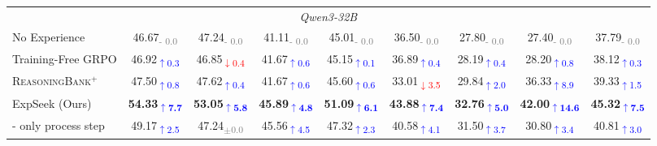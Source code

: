 \begin{table}[!ht]
\begin{tabular*}{0.97\textwidth}{@{\extracolsep{\fill}}l cccc ccc c@{}}
    \midrule
    \multicolumn{9}{c}{\cellcolor{gray!15}\textit{Qwen3-32B}} \\
    No Experience & 46.67\textsubscript{\textcolor{gray}{- 0.0}} & 47.24\textsubscript{\textcolor{gray}{- 0.0}} & 41.11\textsubscript{\textcolor{gray}{- 0.0}} & 45.01\textsubscript{\textcolor{gray}{- 0.0}} & 36.50\textsubscript{\textcolor{gray}{- 0.0}} & 27.80\textsubscript{\textcolor{gray}{- 0.0}} & 27.40\textsubscript{\textcolor{gray}{- 0.0}} & 37.79\textsubscript{\textcolor{gray}{- 0.0}} \\
    Training-Free GRPO & 46.92\textsubscript{\textcolor{blue}{$\uparrow$0.3}} & 46.85\textsubscript{\textcolor{red}{$\downarrow$0.4}} & 41.67\textsubscript{\textcolor{blue}{$\uparrow$0.6}} & 45.15\textsubscript{\textcolor{blue}{$\uparrow$0.1}} & 36.89\textsubscript{\textcolor{blue}{$\uparrow$0.4}} & 28.19\textsubscript{\textcolor{blue}{$\uparrow$0.4}} & 28.20\textsubscript{\textcolor{blue}{$\uparrow$0.8}} & 38.12\textsubscript{\textcolor{blue}{$\uparrow$0.3}} \\
    \textsc{ReasoningBank}$^+$ & 47.50\textsubscript{\textcolor{blue}{$\uparrow$0.8}} & 47.62\textsubscript{\textcolor{blue}{$\uparrow$0.4}} & 41.67\textsubscript{\textcolor{blue}{$\uparrow$0.6}} & 45.60\textsubscript{\textcolor{blue}{$\uparrow$0.6}} & 33.01\textsubscript{\textcolor{red}{$\downarrow$3.5}} & 29.84\textsubscript{\textcolor{blue}{$\uparrow$2.0}} & 36.33\textsubscript{\textcolor{blue}{$\uparrow$8.9}} & 39.33\textsubscript{\textcolor{blue}{$\uparrow$1.5}} \\
    ExpSeek (Ours) & \textbf{54.33}\textsubscript{\textbf{\textcolor{blue}{$\uparrow$7.7}}} & \textbf{53.05}\textsubscript{\textbf{\textcolor{blue}{$\uparrow$5.8}}} & \textbf{45.89}\textsubscript{\textbf{\textcolor{blue}{$\uparrow$4.8}}} & \textbf{51.09}\textsubscript{\textbf{\textcolor{blue}{$\uparrow$6.1}}} & \textbf{43.88}\textsubscript{\textbf{\textcolor{blue}{$\uparrow$7.4}}} & \textbf{32.76}\textsubscript{\textbf{\textcolor{blue}{$\uparrow$5.0}}} & \textbf{42.00}\textsubscript{\textbf{\textcolor{blue}{$\uparrow$14.6}}} & \textbf{45.32}\textsubscript{\textbf{\textcolor{blue}{$\uparrow$7.5}}} \\
    - only process step & 49.17\textsubscript{\textcolor{blue}{$\uparrow$2.5}} & 47.24\textsubscript{\textcolor{gray}{$\pm$0.0}} & 45.56\textsubscript{\textcolor{blue}{$\uparrow$4.5}} & 47.32\textsubscript{\textcolor{blue}{$\uparrow$2.3}} & 40.58\textsubscript{\textcolor{blue}{$\uparrow$4.1}} & 31.50\textsubscript{\textcolor{blue}{$\uparrow$3.7}} & 30.80\textsubscript{\textcolor{blue}{$\uparrow$3.4}} & 40.81\textsubscript{\textcolor{blue}{$\uparrow$3.0}} \\

\end{tabular*}
\end{table}
